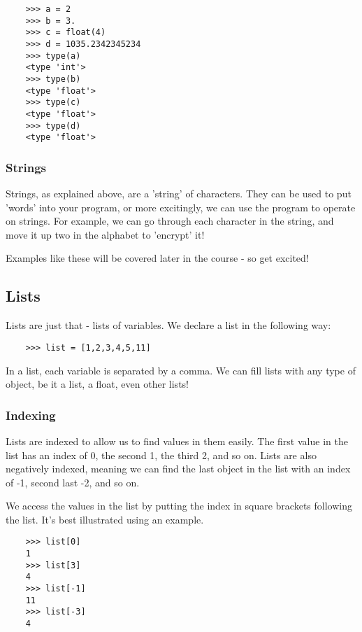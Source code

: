 \begin{lstlisting}
    >>> a = 2
    >>> b = 3.
    >>> c = float(4)
    >>> d = 1035.2342345234
    >>> type(a)
    <type 'int'>
    >>> type(b)
    <type 'float'>
    >>> type(c)
    <type 'float'>
    >>> type(d)
    <type 'float'>
\end{lstlisting}

\subsubsection{Strings}

Strings, as explained above, are a 'string' of characters. They can be used to
put 'words' into your program, or more excitingly, we can use the program to
operate on strings. For example, we can go through each character in the string,
and move it up two in the alphabet to 'encrypt' it!

Examples like these will be covered later in the course - so get excited!

\subsection{Lists}

Lists are just that - lists of variables. We declare a list in the following
way:

\begin{lstlisting}
    >>> list = [1,2,3,4,5,11]
\end{lstlisting}

In a list, each variable is separated by a comma. We can fill lists with any
type of object, be it a list, a float, even other lists!

\subsubsection{Indexing}

Lists are indexed to allow us to find values in them easily. The first value in
the list has an index of 0, the second 1, the third 2, and so on. Lists are also
negatively indexed, meaning we can find the last object in the list with an
index of -1, second last -2, and so on.

We access the values in the list by putting the index in square brackets
following the list. It's best illustrated using an example.

\begin{lstlisting}
    >>> list[0]
    1
    >>> list[3]
    4
    >>> list[-1]
    11
    >>> list[-3]
    4
\end{lstlisting}

